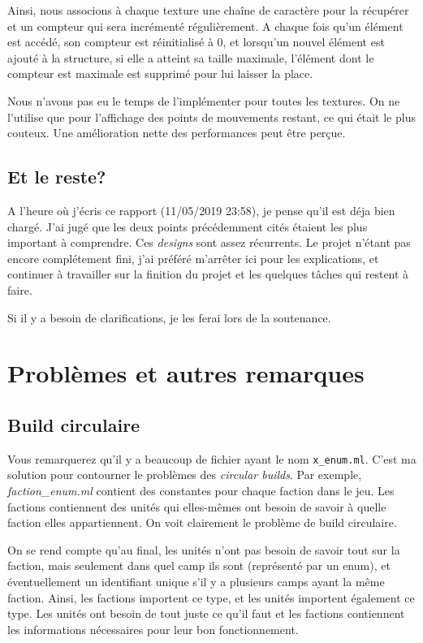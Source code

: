 \documentclass{article}
\begin{document}
Ainsi, nous associons à chaque texture une chaîne de caractère pour la récupérer et un compteur qui sera incrémenté régulièrement.
A chaque fois qu'un élément est accédé, son compteur est réinitialisé à 0, et lorsqu'un nouvel élément est ajouté à la structure, si elle a atteint sa taille maximale, l'élément dont le compteur est maximale est supprimé pour lui laisser la place.

Nous n'avons pas eu le temps de l'implémenter pour toutes les textures. On ne l'utilise que pour l'affichage
des points de mouvements restant, ce qui était le plus couteux. Une amélioration nette des performances peut être perçue.


\subsection{Et le reste?}

A l'heure où j'écris ce rapport (11/05/2019 23:58), je pense qu'il est déja bien chargé. J'ai jugé que les deux points précédemment cités étaient les
plus important à comprendre. Ces \textit{designs} sont assez récurrents. Le projet n'étant pas encore complétement fini,
j'ai préféré m'arrêter ici pour les explications, et continuer à travailler sur la finition du projet et les quelques tâches qui restent à faire.

Si il y a besoin de clarifications, je les ferai lors de la soutenance.

\section{Problèmes et autres remarques}
\subsection{Build circulaire}
Vous remarquerez qu'il y a beaucoup de fichier ayant le nom \texttt{x\_enum.ml}. C'est ma solution pour contourner le problèmes des
\textit{circular builds}. Par exemple, \textit{faction\_enum.ml} contient des constantes pour chaque faction dans le jeu.
Les factions contiennent des unités qui elles-mêmes ont besoin de savoir à quelle faction elles appartiennent. On voit clairement
le problème de build circulaire. 

On se rend compte qu'au final, les unités n'ont pas besoin de savoir tout sur la faction, mais seulement dans quel camp ils sont (représenté par un enum),
et éventuellement un identifiant unique s'il y a plusieurs camps ayant la même faction. Ainsi, les factions importent ce type, et 
les unités importent également ce type. Les unités ont besoin de tout juste ce qu'il faut et les factions contiennent les 
informations nécessaires pour leur bon fonctionnement.
\end{document}
